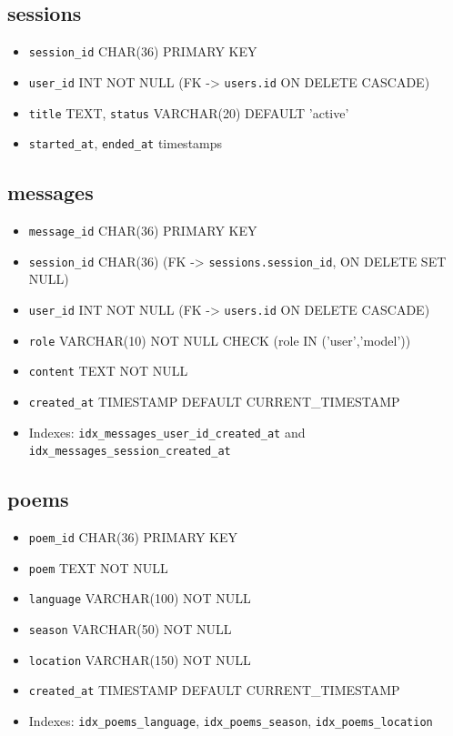 \subsection*{sessions}
\begin{itemize}
  \item \texttt{session\_id} CHAR(36) PRIMARY KEY
  \item \texttt{user\_id} INT NOT NULL (FK -> \texttt{users.id} ON DELETE CASCADE)
  \item \texttt{title} TEXT, \texttt{status} VARCHAR(20) DEFAULT 'active'
  \item \texttt{started\_at}, \texttt{ended\_at} timestamps
\end{itemize}

\subsection*{messages}
\begin{itemize}
  \item \texttt{message\_id} CHAR(36) PRIMARY KEY
  \item \texttt{session\_id} CHAR(36) (FK -> \texttt{sessions.session\_id}, ON DELETE SET NULL)
  \item \texttt{user\_id} INT NOT NULL (FK -> \texttt{users.id} ON DELETE CASCADE)
  \item \texttt{role} VARCHAR(10) NOT NULL CHECK (role IN ('user','model'))
  \item \texttt{content} TEXT NOT NULL
  \item \texttt{created\_at} TIMESTAMP DEFAULT CURRENT\_TIMESTAMP
  \item Indexes: \texttt{idx\_messages\_user\_id\_created\_at} and \texttt{idx\_messages\_session\_created\_at}
\end{itemize}

\subsection*{poems}
\begin{itemize}
  \item \texttt{poem\_id} CHAR(36) PRIMARY KEY
  \item \texttt{poem} TEXT NOT NULL
  \item \texttt{language} VARCHAR(100) NOT NULL
  \item \texttt{season} VARCHAR(50) NOT NULL
  \item \texttt{location} VARCHAR(150) NOT NULL
  \item \texttt{created\_at} TIMESTAMP DEFAULT CURRENT\_TIMESTAMP
  \item Indexes: \texttt{idx\_poems\_language}, \texttt{idx\_poems\_season}, \texttt{idx\_poems\_location}
\end{itemize}

